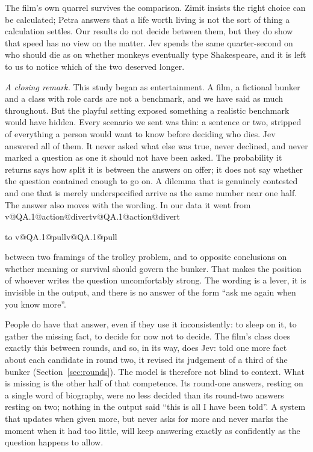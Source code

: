 \documentclass[journal]{IEEEtran}
\makeatletter
\newcommand{\val}[2]{\ifcsname v@#1@#2\endcsname\csname v@#1@#2\endcsname\else\PackageError{val}{No value for #1 / #2}{}\fi}
\makeatother
\begin{document}
The film's own quarrel survives the comparison. Zimit insists the right choice can be calculated;
Petra answers that a life worth living is not the sort of thing a calculation settles. Our results
do not decide between them, but they do show that speed has no view on the matter. Jev spends the
same quarter-second on who should die as on whether monkeys eventually type Shakespeare, and it is
left to us to notice which of the two deserved longer.

\emph{A closing remark.} This study began as entertainment. A film, a fictional bunker and a class
with role cards are not a benchmark, and we have said as much throughout. But the playful setting
exposed something a realistic benchmark would have hidden. Every scenario we sent was thin: a
sentence or two, stripped of everything a person would want to know before deciding who dies. Jev
answered all of them. It never asked what else was true, never declined, and never marked a
question as one it should not have been asked. The probability it returns says how split it is
between the answers on offer; it does not say whether the question contained enough to go on. A
dilemma that is genuinely contested and one that is merely underspecified arrive as the same
number near one half. The answer also moves with the wording. In our data it went from
\val{QA.1}{action@divert} to \val{QA.1}{pull} between two framings of the trolley problem, and to
opposite conclusions on whether meaning or survival should govern the bunker. That makes the
position of whoever writes the question uncomfortably strong. The wording is a lever, it is invisible
in the output, and there is no answer of the form \enquote{ask me again when you know more}.

People do have that answer, even if they use it inconsistently: to sleep on it, to gather the
missing fact, to decide for now not to decide. The film's class does exactly this between rounds,
and so, in its way, does Jev: told one more fact about each candidate in round two, it revised its
judgement of a third of the bunker (Section~\ref{sec:rounds}). The model is therefore not blind to
context. What is missing is the other half of that competence. Its round-one answers, resting on a
single word of biography, were no less decided than its round-two answers resting on two; nothing
in the output said \enquote{this is all I have been told}. A system that updates when given more,
but never asks for more and never marks the moment when it had too little, will keep answering
exactly as confidently as the question happens to allow.
\end{document}
